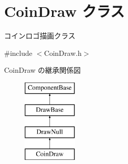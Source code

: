 \hypertarget{class_coin_draw}{}\section{Coin\+Draw クラス}
\label{class_coin_draw}


コインロゴ描画クラス  




{\ttfamily \#include $<$Coin\+Draw.\+h$>$}

Coin\+Draw の継承関係図\begin{figure}[H]
\begin{center}
\leavevmode
\includegraphics[height=4.000000cm]{class_coin_draw}
\end{center}
\end{figure}
